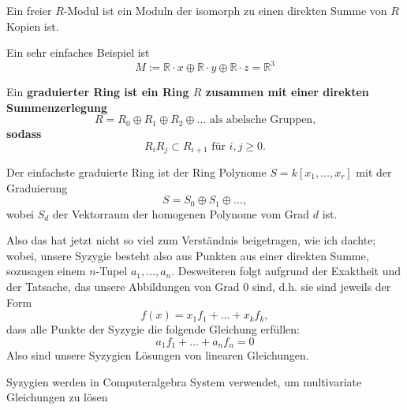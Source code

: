 \documentclass{article}
\begin{document}
	\begin{defn}
		Ein freier 
		\(R\)-Modul
		ist ein Moduln der isomorph zu einen direkten Summe von 
		\( R \)
		Kopien ist.
	\end{defn}
	\begin{bsp}
		Ein sehr einfaches Beispiel ist 
		\[
			M:= \mathbb{R} \cdot x \oplus
			\mathbb{R} \cdot y \oplus
			\mathbb{R} \cdot z =
			\mathbb{R}^3
		\]
	\end{bsp}
	\begin{defn}
		Ein \bf{graduierter Ring} ist ein Ring 
		\( R \)
		zusammen mit einer direkten Summenzerlegung
		\[
			R=R_{0} \oplus R_{1} \oplus R_{2} \oplus \dots 
			\text{ als abelsche Gruppen,}
		\]
		sodass 
		\[
			R_{i}R_{j} \subset R_{i+1} \text{\ f\"ur \ } i,j \ge 0.
		\]
	\end{defn}
	\begin{bsp}
		Der einfachste graduierte Ring ist der Ring Polynome
		\( S = k\left[ x_{1}, \dots ,x_{r} \right] \)
		mit der Graduierung 
		\[
			S=S_{0} \oplus S_{1} \oplus \dots ,
		\]
		wobei 
		\( S_{d} \) 
		der Vektorraum der homogenen Polynome vom Grad
		\( d \) 
		ist.
	\end{bsp}
	
	Also das hat jetzt nicht so viel zum Verst\"andnis beigetragen, 
	wie ich dachte;  
	wobei,
	unsere Syzygie besteht also aus Punkten 
	aus einer direkten Summe, 
	sozusagen einem 
	\(n\)-Tupel 
	\(a_{1},\dots,a_{n}\).
	Desweiteren folgt aufgrund der Exaktheit und der Tatsache, 
	das unsere Abbildungen von Grad 0 sind,
	d.h. sie sind jeweils der Form
	\[
		f\left( x \right)=x_{1}f_{1} + \dots + x_{k}f_{k},
	\]
	dass alle Punkte der Syzygie die folgende Gleichung erf\"ullen:
	\[
		a_{1} f_{1} + \dots + a_{n} f_{n} = 0	
	\]
	Also sind unsere Syzygien L\"osungen von linearen Gleichungen.
	
	Syzygien werden in Computeralgebra System verwendet,
	um multivariate Gleichungen zu l\"osen\nocite{WA_1}

	
\end{document}

